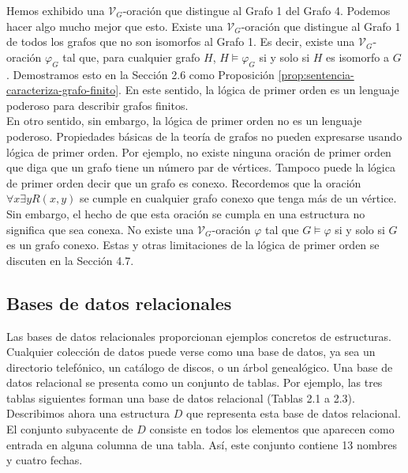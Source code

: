 \documentclass[12pt,a4paper]{book}
\newcommand{\VV}{\mathcal{V}}
\begin{document}
    Hemos exhibido una $\VV_{G}$-oración que distingue al Grafo 1 del Grafo 4. Podemos hacer algo mucho mejor que esto.
    Existe una $\VV_{G}$-oración que distingue al Grafo 1 de todos los grafos que no son isomorfos al Grafo 1. Es decir,
    existe una $\VV_{G}$-oración $\varphi_{G}$ tal que, para cualquier grafo $H$, $H\models\varphi_{G}$ si y solo si $H$
    es isomorfo a $G$. Demostramos esto en la Sección 2.6 como Proposición \ref{prop:sentencia-caracteriza-grafo-finito}. En
    este sentido, la lógica de primer orden es un lenguaje poderoso para describir grafos finitos.\\
    En otro sentido, sin embargo, la lógica de primer orden no es un lenguaje poderoso. Propiedades básicas de la teoría de
    grafos no pueden expresarse usando lógica de primer orden. Por ejemplo, no existe ninguna oración de primer orden que
    diga que un grafo tiene un número par de vértices. Tampoco puede la lógica de primer orden decir que un grafo es
    conexo. Recordemos que la oración $\forall x\exists yR(x,y)$ se cumple en cualquier grafo conexo que tenga más de un
    vértice. Sin embargo, el hecho de que esta oración se cumpla en una estructura no significa que sea conexa. No existe
    una $\VV_{G}$-oración $\varphi$ tal que $G\models\varphi$ si y solo si $G$ es un grafo conexo. Estas y otras
    limitaciones de la lógica de primer orden se discuten en la Sección 4.7.

    \subsection{Bases de datos relacionales}

    Las bases de datos relacionales proporcionan ejemplos concretos de estructuras. Cualquier colección de datos puede
    verse como una base de datos, ya sea un directorio telefónico, un catálogo de discos, o un árbol genealógico. Una base
    de datos relacional se presenta como un conjunto de tablas. Por ejemplo, las tres tablas siguientes forman una base de
    datos relacional (Tablas 2.1 a 2.3).\\
    Describimos ahora una estructura $D$ que representa esta base de datos relacional. El conjunto subyacente de $D$
    consiste en todos los elementos que aparecen como entrada en alguna columna de una tabla. Así, este conjunto contiene
    13 nombres y cuatro fechas.
\end{document}
